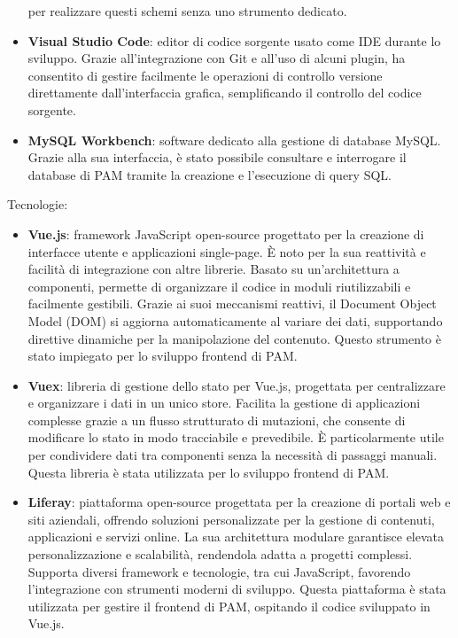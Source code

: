 \begin{itemize}
    per realizzare questi schemi senza uno strumento dedicato.
    \item \textbf{Visual Studio Code}: editor di codice sorgente usato come IDE durante lo sviluppo. Grazie all'integrazione con Git e all'uso di alcuni plugin, ha consentito
    di gestire facilmente le operazioni di controllo versione direttamente dall’interfaccia grafica, semplificando il controllo del codice sorgente.
    \item \textbf{MySQL Workbench}: software dedicato alla gestione di database MySQL. Grazie alla sua interfaccia, è stato possibile consultare e interrogare il database di \ac{PAM}
    tramite la creazione e l’esecuzione di query SQL.
\end{itemize}

Tecnologie:
\begin{itemize}
    \item \textbf{Vue.js}: framework JavaScript open-source progettato per la creazione di interfacce utente e applicazioni single-page. È noto per la sua reattività e
    facilità di integrazione con altre librerie. Basato su un’architettura a componenti, permette di organizzare il codice in moduli riutilizzabili e facilmente
    gestibili. Grazie ai suoi meccanismi reattivi, il Document Object Model (DOM) si aggiorna automaticamente al variare dei dati, supportando direttive dinamiche
    per la manipolazione del contenuto. Questo strumento è stato impiegato per lo sviluppo frontend di \ac{PAM}.
    \item \textbf{Vuex}: libreria di gestione dello stato per Vue.js, progettata per centralizzare e organizzare i dati in un unico store. Facilita la gestione di
    applicazioni complesse grazie a un flusso strutturato di mutazioni, che consente di modificare lo stato in modo tracciabile e prevedibile. È particolarmente utile
    per condividere dati tra componenti senza la necessità di passaggi manuali. Questa libreria è stata utilizzata per lo sviluppo frontend di \ac{PAM}.
    \item \textbf{Liferay}: piattaforma open-source progettata per la creazione di portali web e siti aziendali, offrendo soluzioni personalizzate per la gestione di
    contenuti, applicazioni e servizi online. La sua architettura modulare garantisce elevata personalizzazione e scalabilità, rendendola adatta a progetti complessi.
    Supporta diversi framework e tecnologie, tra cui JavaScript, favorendo l’integrazione con strumenti moderni di sviluppo. Questa piattaforma è stata utilizzata per
    gestire il frontend di \ac{PAM}, ospitando il codice sviluppato in Vue.js.

\end{itemize}
